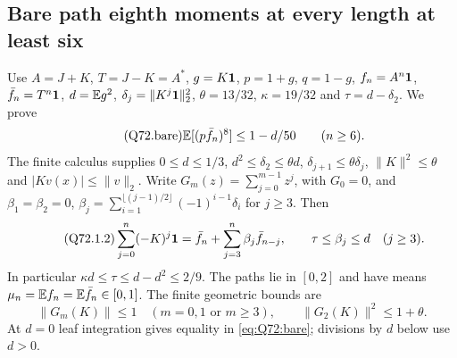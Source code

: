 \subsection{Bare path eighth moments at every length at least six}\label{proof:Q5-C072-bare}
Use $A=\allowbreak J+K$, $T=\allowbreak J-K=\allowbreak A^*$, $g=\allowbreak K\mathbf1$, $p=\allowbreak 1+g$, $q=\allowbreak 1-g$,
$f_n=\allowbreak A^n\mathbf1$, $\bar f_n=\allowbreak T^n\mathbf1$, $d=\allowbreak \mathbb E g^2$,
$\delta_j=\allowbreak \|K^j\mathbf1\|_2^2$, $\theta=\allowbreak 13/32$, $\kappa=\allowbreak 19/32$ and
$\tau=\allowbreak d-\delta_2$. We prove
\begin{equation}\tag{Q72.bare}\label{eq:Q72:bare}
 \mathbb E[(p\bar f_n)^8]\le1-d/50\qquad(n\ge6).
\end{equation}
The finite calculus supplies
$0\le\allowbreak  d\le\allowbreak 1/3$, $d^2\le\allowbreak \delta_2\le\allowbreak \theta d$,
$\delta_{j+1}\le\allowbreak \theta\delta_j$, $\|K\|^2\le\allowbreak \theta$ and
$|Kv(x)|\le\allowbreak \|v\|_2$. Write $G_m(z)=\allowbreak \sum_{j=\allowbreak 0}^{m-1}z^j$, with $G_0=\allowbreak 0$,
and $\beta_1=\allowbreak \beta_2=\allowbreak 0$,
$\beta_j=\allowbreak \sum_{i=\allowbreak 1}^{\lfloor(j-1)/2\rfloor}(-1)^{i-1}\delta_i$ for $j\ge\allowbreak 3$.
Then
\begin{equation}\tag{Q72.1.2}\label{eq:Q72:convolution}
 \sum_{j=0}^n(-K)^j\mathbf1
 =\bar f_n+\sum_{j=3}^n\beta_j\bar f_{n-j},\qquad
 \tau\le\beta_j\le d\quad(j\ge3).
\end{equation}
In particular $\kappa d\le\allowbreak \tau\le\allowbreak  d-d^2\le\allowbreak 2/9$.
The paths lie in $[0,\allowbreak 2]$ and have means
$\mu_n=\allowbreak \mathbb E f_n=\allowbreak \mathbb E\bar f_n\in[0,\allowbreak 1]$. The finite geometric bounds are
\begin{equation}\tag{Q72.1.4}\label{eq:Q72:finite-G}
 \|G_m(K)\|\le1\quad(m=0,1\text{ or }m\ge3),\qquad
 \|G_2(K)\|^2\le1+\theta.
\end{equation}
At $d=\allowbreak 0$ leaf integration gives equality in \eqref{eq:Q72:bare}; divisions
by $d$ below use $d>\allowbreak 0$.

